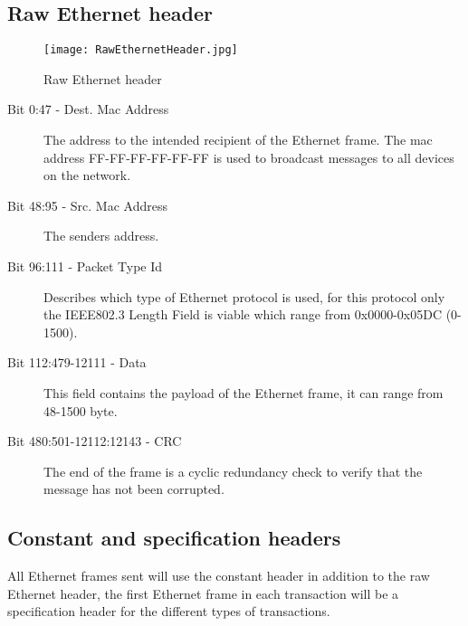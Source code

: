 \subsection{Raw Ethernet header}
\begin{figure}
\centering
\texttt{[image: RawEthernetHeader.jpg]}
\caption{Raw Ethernet header}
\label{fig:RawEthernetHeader}
\end{figure}

\begin{description}
\item [Bit 0:47 - Dest. Mac Address] The address to the intended recipient of the Ethernet frame. The mac address FF-FF-FF-FF-FF-FF is used to broadcast messages to all devices on the network.
\item [Bit 48:95 - Src. Mac Address] The senders address.
\item [Bit 96:111 - Packet Type Id] Describes which type of Ethernet protocol is used, for this protocol only the IEEE802.3 Length Field is viable which range from 0x0000-0x05DC (0-1500).
\item [Bit 112:479-12111 - Data] This field contains the payload of the Ethernet frame, it can range from 48-1500 byte.
\item [Bit 480:501-12112:12143 - CRC] The end of the frame is a cyclic redundancy check to verify that the message has not been corrupted.
\end{description}
\subsection{Constant and specification headers}
All Ethernet frames sent will use the constant header in addition to the raw Ethernet header, the first Ethernet frame in each transaction will be a specification header for the different types of transactions.
